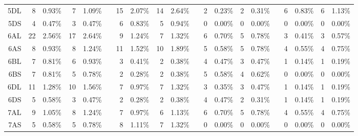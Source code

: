 \begin{sidewaystable}
\begin{localsize}{6}{9}
\begin{tabular}{rrrrrrrrrrrrrrrrrrrr}
 5DL            & 8                     & 0.93\%  & 7     & 1.09\%  &    & 15          & 2.07\%  & 14    & 2.64\%  &    & 2                      & 0.23\%  & 2     & 0.31\%  &    & 6           & 0.83\%  & 6     & 1.13\%  \\
 5DS            & 4                     & 0.47\%  & 3     & 0.47\%  &    & 6           & 0.83\%  & 5     & 0.94\%  &    & 0                      & 0.00\%  & 0     & 0.00\%  &    & 0           & 0.00\%  & 0     & 0.00\%  \\
  \midrule
  6AL            & 22                    & 2.56\%  & 17    & 2.64\%  &    & 9           & 1.24\%  & 7     & 1.32\%  &    & 6                      & 0.70\%  & 5     & 0.78\%  &    & 3           & 0.41\%  & 3     & 0.57\%  \\
 6AS            & 8                     & 0.93\%  & 8     & 1.24\%  &    & 11          & 1.52\%  & 10    & 1.89\%  &    & 5                      & 0.58\%  & 5     & 0.78\%  &    & 4           & 0.55\%  & 4     & 0.75\%  \\
 6BL            & 7                     & 0.81\%  & 6     & 0.93\%  &    & 3           & 0.41\%  & 2     & 0.38\%  &    & 4                      & 0.47\%  & 3     & 0.47\%  &    & 1           & 0.14\%  & 1     & 0.19\%  \\
 6BS            & 7                     & 0.81\%  & 5     & 0.78\%  &    & 2           & 0.28\%  & 2     & 0.38\%  &    & 5                      & 0.58\%  & 4     & 0.62\%  &    & 0           & 0.00\%  & 0     & 0.00\%  \\
 6DL            & 11                    & 1.28\%  & 10    & 1.56\%  &    & 7           & 0.97\%  & 7     & 1.32\%  &    & 3                      & 0.35\%  & 3     & 0.47\%  &    & 1           & 0.14\%  & 1     & 0.19\%  \\
 6DS            & 5                     & 0.58\%  & 3     & 0.47\%  &    & 2           & 0.28\%  & 2     & 0.38\%  &    & 4                      & 0.47\%  & 2     & 0.31\%  &    & 1           & 0.14\%  & 1     & 0.19\%  \\
  \midrule
  7AL            & 9                     & 1.05\%  & 8     & 1.24\%  &    & 7           & 0.97\%  & 6     & 1.13\%  &    & 6                      & 0.70\%  & 5     & 0.78\%  &    & 4           & 0.55\%  & 4     & 0.75\%  \\
 7AS            & 5                     & 0.58\%  & 5     & 0.78\%  &    & 8           & 1.11\%  & 7     & 1.32\%  &    & 0                      & 0.00\%  & 0     & 0.00\%  &    & 0           & 0.00\%  & 0     & 0.00\%  \\

\end{tabular}
\end{localsize}
\end{sidewaystable}
